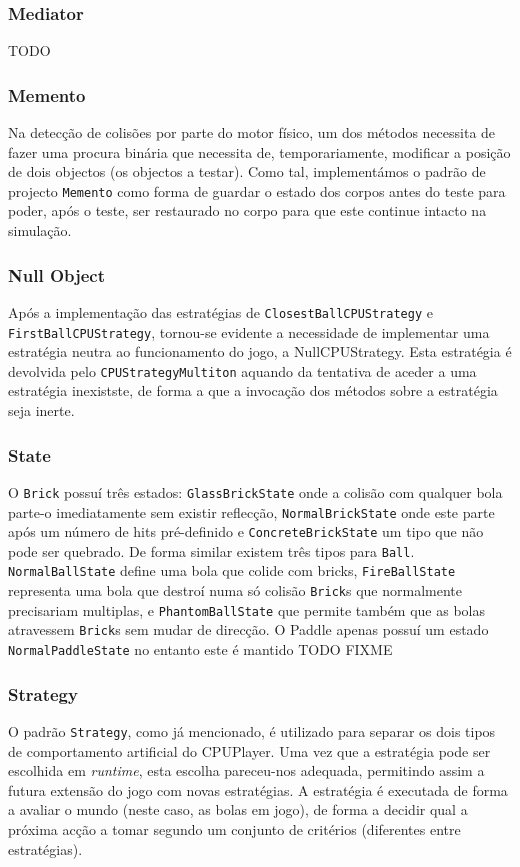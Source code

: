 \documentclass[a4paper]{article}
\begin{document}
\subsubsection{Mediator}
\noindent TODO

\subsubsection{Memento}
\noindent Na detecção de colisões por parte do motor físico, um dos métodos necessita de fazer uma procura binária que necessita de, temporariamente, modificar a posição de dois objectos (os objectos a testar). Como tal, implementámos o padrão de projecto \texttt{Memento} como forma de guardar o estado dos corpos antes do teste para poder, após o teste, ser restaurado no corpo para que este continue intacto na simulação.

\subsubsection{Null Object}
\noindent Após a implementação das estratégias de \texttt{ClosestBallCPUStrategy} e \texttt{FirstBallCPUStrategy}, tornou-se evidente a necessidade de implementar uma estratégia neutra ao funcionamento do jogo, a NullCPUStrategy. Esta estratégia é devolvida pelo \texttt{CPUStrategyMultiton} aquando da tentativa de aceder a uma estratégia inexistste, de forma a que a invocação dos métodos sobre a estratégia seja inerte.

\subsubsection{State}
O \texttt{Brick} possuí três estados: \texttt{GlassBrickState} onde a colisão com qualquer bola parte-o imediatamente sem existir reflecção, \texttt{NormalBrickState} onde este parte após um número de hits pré-definido e \texttt{ConcreteBrickState} um tipo que não pode ser quebrado. De forma similar existem três tipos para \texttt{Ball}. \texttt{NormalBallState} define uma bola que colide com bricks, \texttt{FireBallState} representa uma bola que destroí numa só colisão \texttt{Brick}s que normalmente precisariam multiplas, e \texttt{PhantomBallState} que permite também que as bolas atravessem \texttt{Brick}s sem mudar de direcção. O Paddle apenas possuí um estado \texttt{NormalPaddleState} no entanto este é mantido %
TODO FIXME

\subsubsection{Strategy}
\noindent O padrão \texttt{Strategy}, como já mencionado, é utilizado para separar os dois tipos de comportamento artificial do CPUPlayer. Uma vez que a estratégia pode ser escolhida em \textit{runtime}, esta escolha pareceu-nos adequada, permitindo assim a futura extensão do jogo com novas estratégias. A estratégia é executada de forma a avaliar o mundo (neste caso, as bolas em jogo), de forma a decidir qual a próxima acção a tomar segundo um conjunto de critérios (diferentes entre estratégias).
\end{document}
